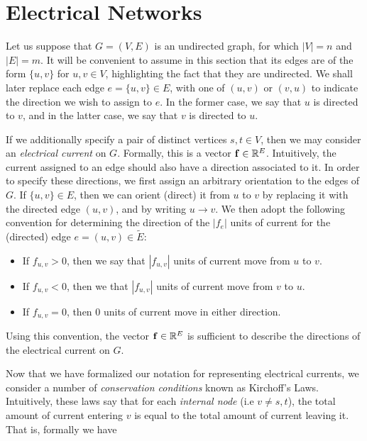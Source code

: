 \documentclass[11pt]{article}
\begin{document}
\newcommand{\coursenum}{{CSC 2421H}}
\newcommand{\coursename}{{Graphs, Matrices, and Optimization}}
\newcommand{\courseprof}{Sushant Sachdeva}


\section{Electrical Networks}

Let us suppose that $G=(V,E)$ is an undirected graph, for which $|V|=n$ and $|E|=m$. It will be convenient
to assume in this section that its edges are of the form $\{u,v\}$ for $u,v \in V$, highlighting
the fact that they are undirected. We shall later replace each edge $e=\{u,v\} \in E$,
with one of $(u,v)$ or $(v,u)$ to indicate the direction we wish to assign to $e$. In the
former case, we say that $u$ is directed to $v$, and in the latter case, we say that $v$ is directed
to $u$.

If we additionally specify a pair of distinct vertices $s,t \in V$, then we may consider an \textit{electrical
current} on $G$. Formally, this is a vector $\V{f} \in \rea^{E}$. Intuitively, the current assigned
to an edge should also have a direction associated to it. In order to specify these directions, 
we first assign an arbitrary orientation to the edges of $G$. If $\{u,v\} \in E$, then we can orient (direct) it from $u$ to $v$ by replacing it with the directed edge $(u,v)$,
and by writing $u \rightarrow v$. We then adopt the following convention for determining the direction
of the $|f_{e}|$ units of current for the (directed) edge $e=(u,v) \in \tilde{E}$:

\begin{itemize}
\item If $f_{u,v} >0$, then we say that $|f_{u,v}|$ units of current move from $u$ to $v$.
\item If $f_{u,v} < 0$, then we that $|f_{u,v}|$ units of current move from $v$ to $u$.
\item If $f_{u,v}=0$, then $0$ units of current move in either direction.

\end{itemize}

Using this convention, the vector $\V{f} \in \rea^{E}$ is sufficient to describe the directions of the electrical current 
on $G$. 

Now that we have formalized our notation for representing electrical currents, we consider a
number of \textit{conservation conditions} known as Kirchoff's Laws. Intuitively, these laws
say that for each \textit{internal node} (i.e $v \neq s,t$), the total amount of current entering
$v$ is equal to the total amount of current leaving it. That is, formally we have
\end{document}
